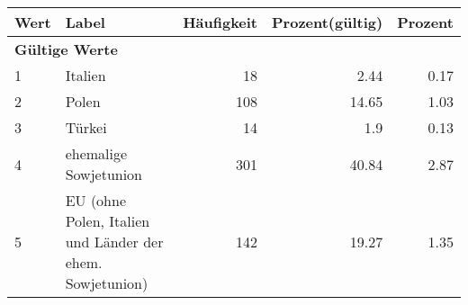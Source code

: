      \begin{longtable}{lXrrr}
     \toprule
     \textbf{Wert} & \textbf{Label} & \textbf{Häufigkeit} & \textbf{Prozent(gültig)} & \textbf{Prozent} \\
     \endhead
     \midrule
     \multicolumn{5}{l}{\textbf{Gültige Werte}}\\

     1 &
     \multicolumn{1}{X}{ Italien   } &


       \num{18} &
       \num[round-mode=places,round-precision=2]{2,44} &
         \num[round-mode=places,round-precision=2]{0,17} \\

     2 &
     \multicolumn{1}{X}{ Polen   } &


       \num{108} &
       \num[round-mode=places,round-precision=2]{14,65} &
         \num[round-mode=places,round-precision=2]{1,03} \\

     3 &
     \multicolumn{1}{X}{ Türkei   } &


       \num{14} &
       \num[round-mode=places,round-precision=2]{1,9} &
         \num[round-mode=places,round-precision=2]{0,13} \\

     4 &
     \multicolumn{1}{X}{ ehemalige Sowjetunion   } &


       \num{301} &
       \num[round-mode=places,round-precision=2]{40,84} &
         \num[round-mode=places,round-precision=2]{2,87} \\

     5 &
     \multicolumn{1}{X}{ EU (ohne Polen, Italien und Länder der ehem. Sowjetunion)   } &


       \num{142} &
       \num[round-mode=places,round-precision=2]{19,27} &
         \num[round-mode=places,round-precision=2]{1,35} \\


\end{longtable}
